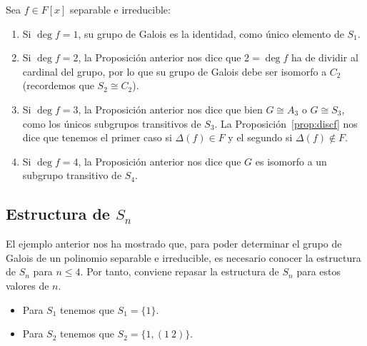 \begin{ejemplo}\label{ej:grupos_galois}
    Sea $f\in F[x]$ separable e irreducible: 
    \begin{enumerate}
        \item Si $\deg f = 1$, su grupo de Galois es la identidad, como único elemento de $S_1$.
        \item Si $\deg f = 2$, la Proposición anterior nos dice que $2 = \deg f$ ha de dividir al cardinal del grupo, por lo que su grupo de Galois debe ser isomorfo a $C_2$ (recordemos que $S_2\cong C_2$).
        \item Si $\deg f = 3$, la Proposición anterior nos dice que bien $G\cong A_3$ o $G\cong S_3$, como los únicos subgrupos transitivos de $S_3$. La Proposición~\ref{prop:discf} nos dice que tenemos el primer caso si $\Delta(f)\in F$ y el segundo si $\Delta(f)\notin F$.
        \item \label{item:deg4}
        Si $\deg f = 4$, la Proposición anterior nos dice que $G$ es isomorfo a un subgrupo transitivo de $S_4$.
    \end{enumerate}
\end{ejemplo}

\subsection{Estructura de $S_n$}

El ejemplo anterior nos ha mostrado que, para poder determinar el grupo de Galois de un polinomio separable e irreducible, es necesario conocer la estructura de $S_n$ para $n\leq 4$. Por tanto, conviene repasar la estructura de $S_n$ para estos valores de $n$.
\begin{itemize}
    \item Para $S_1$ tenemos que $S_1 = \{1\}$.
    \item Para $S_2$ tenemos que $S_2 = \{1, (1\ 2)\}$.
\end{itemize}

